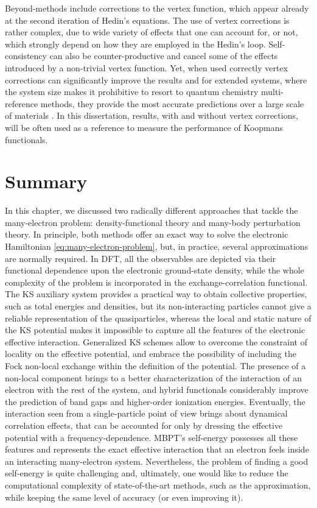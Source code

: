 Beyond-\gw methods include corrections to the vertex function, which appear already at the second iteration of Hedin's equations. The use of vertex corrections is rather complex, due to wide variety of effects that one can account for, or not, which strongly depend on how they are employed in the Hedin's loop. Self-consistency can also be counter-productive and cancel some of the effects introduced by a non-trivial vertex function. Yet, when used correctly vertex corrections can significantly improve the \gw results and for extended systems, where the system size makes it prohibitive to resort to quantum chemistry multi-reference methods, they provide the most accurate predictions over a large scale of materials \cite{chen_accurate_2015, shishkin_accurate_2007}. In this dissertation, \gw results, with and without vertex corrections, will be often used as a reference to measure the performance of Koopmans functionals.

\clearpage
\section{Summary\label{sec:ch2-summary}}
In this chapter, we discussed two radically different approaches that tackle the many-electron problem: density-functional theory and many-body perturbation theory. In principle, both methods offer an exact way to solve the electronic Hamiltonian \eqref{eq:many-electron-problem}, but, in practice, several approximations are normally required. In DFT, all the observables are depicted via their functional dependence upon the electronic ground-state density, while the whole complexity of the problem is incorporated in the exchange-correlation functional. The KS auxiliary system provides a practical way to obtain collective properties, such as total energies and densities, but its non-interacting particles cannot give a reliable representation of the quasiparticles, whereas the local and static nature of the KS potential makes it impossible to capture all the features of the electronic effective interaction. Generalized KS schemes allow to overcome the constraint of locality on the effective potential, and embrace the possibility of including the Fock non-local exchange within the definition of the potential. The presence of a non-local component brings to a better characterization of the interaction of an electron with the rest of the system, and hybrid functionals considerably improve the prediction of band gaps and higher-order ionization energies. Eventually, the interaction seen from a single-particle point of view brings about dynamical correlation effects, that can be accounted for only by dressing the effective potential with a frequency-dependence. MBPT's self-energy possesses all these features and represents the exact effective interaction that an electron feels inside an interacting many-electron system. Nevertheless, the problem of finding a good self-energy is quite challenging and, ultimately, one would like to reduce the computational complexity of state-of-the-art methods, such as the \gw approximation, while keeping the same level of accuracy (or even improving it).

